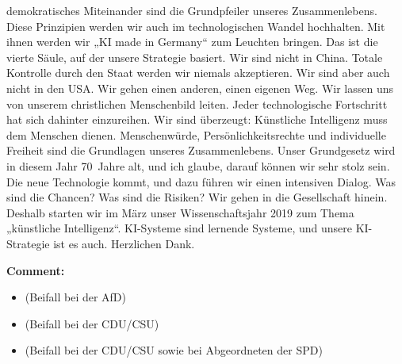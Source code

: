 \documentclass{article}
\begin{document}
demokratisches Miteinander sind die Grundpfeiler unseres Zusammenlebens. Diese Prinzipien werden wir auch im technologischen Wandel hochhalten. Mit ihnen werden wir „KI made in Germany“ zum Leuchten bringen.  Das ist die vierte Säule, auf der unsere Strategie basiert. Wir sind nicht in China. Totale Kontrolle durch den Staat werden wir niemals akzeptieren. Wir sind aber auch nicht in den USA. Wir gehen einen anderen, einen eigenen Weg. Wir lassen uns von unserem christlichen Menschenbild leiten. Jeder technologische Fortschritt hat sich dahinter einzureihen. Wir sind überzeugt: Künstliche Intelligenz muss dem Menschen dienen. Menschenwürde, Persönlichkeitsrechte und individuelle Freiheit sind die Grundlagen unseres Zusammenlebens. Unser Grundgesetz wird in diesem Jahr 70 Jahre alt, und ich glaube, darauf können wir sehr stolz sein. Die neue Technologie kommt, und dazu führen wir einen intensiven Dialog. Was sind die Chancen? Was sind die Risiken? Wir gehen in die Gesellschaft hinein. Deshalb starten wir im März unser Wissenschaftsjahr 2019 zum Thema „künstliche Intelligenz“. KI-Systeme sind lernende Systeme, und unsere KI-Strategie ist es auch. Herzlichen Dank.  

\noindent\textbf{Comment:}
\begin{itemize}
    \setlength\itemsep{-3pt}
    \item (Beifall bei der AfD)
    \setlength\itemsep{-3pt}
    \item (Beifall bei der CDU/CSU)
    \setlength\itemsep{-3pt}
    \item (Beifall bei der CDU/CSU sowie bei Abgeordneten der SPD)
\end{itemize}
\end{document}
